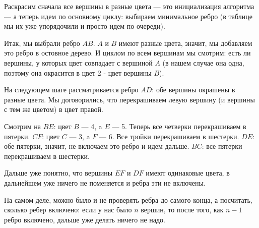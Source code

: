 \documentclass[russian]{lecture-notes}
\begin{document}
\begin{example}
		Раскрасим сначала все вершины в разные цвета --- это инициализация алгоритма --- а теперь идем по основному циклу: выбираем минимальное ребро (в таблице мы их уже упорядочили и просто идем по очереди).
		
		Итак, мы выбрали ребро $AB$. $A$ и $B$ имеют разные цвета, значит, мы добавляем это ребро в остовное дерево. И циклом по всем вершинам мы смотрим: есть ли вершины, у которых цвет совпадает с вершиной $A$ (в нашем случае она одна, поэтому она окрасится в цвет 2 - цвет вершины $B$). 
		
		На следующем шаге рассматривается ребро $AD$: обе вершины окрашены в разные цвета. Мы договорились, что перекрашиваем левую вершину (и вершины с тем же цветом) в цвет правой.
		
		Смотрим на $BE$: цвет $B$ --- 4, a $E$ --- 5. Теперь все четверки перекрашиваем в пятерки. $CF$: цвет $C$ --- 3, a $F$ --- 6. Все тройки перекрашиваем в шестерки. $DE$: обе пятерки, значит, не включаем это ребро и идем дальше. $BC$: все пятерки перекрашиваем в шестерки.
		
		Дальше уже понятно, что вершины $EF$ и $DF$ имеют одинаковые цвета, в дальнейшем уже ничего не поменяется и ребра эти не включены.
		
		\begin{remark}
			На самом деле, можно было и не проверять ребра до самого конца, а посчитать, сколько ребер включено: если у нас было $n$ вершин, то после того, как $n-1$ ребро включено, дальше уже делать ничего не надо.
		\end{remark}
		
	\end{example}
	
\end{document}
